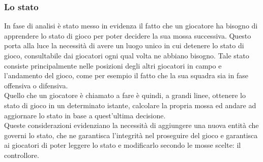 %

%

\subsubsection{Lo stato}
\label{sec:entita_coinvolte_stato}

In fase di analisi è stato messo in evidenza il fatto che un giocatore ha bisogno di apprendere lo stato di gioco per poter decidere la sua mossa successiva. Questo porta alla luce la necessità di avere un luogo unico in cui detenere lo stato di gioco, consultabile dai giocatori ogni qual volta ne abbiano bisogno. Tale stato consiste principalmente nelle posizioni degli altri giocatori in campo e l'andamento del gioco, come per esempio il fatto che la sua squadra sia in fase offensiva o difensiva.\\

Quello che un giocatore è chiamato a fare è quindi, a grandi linee, ottenere lo stato di gioco in un determinato istante, calcolare la propria mossa ed andare ad aggiornare lo stato in base a quest'ultima decisione.\\

Queste considerazioni evidenziano la necessità di aggiungere una nuova entità che governi lo stato, che ne garantisca l'integrità nel proseguire del gioco e garantisca ai giocatori di poter leggere lo stato e modificarlo secondo le mosse scelte: il controllore.
